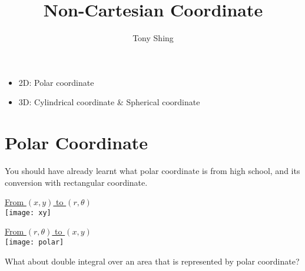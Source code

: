 \documentclass[class=article, crop=false, 12pt]{standalone}
\author{Tony Shing}
\title{Non-Cartesian Coordinate}
\begin{document}
\maketitle


\begin{overview}
    \begin{itemize}
        \item 2D: Polar coordinate
        \item 3D: Cylindrical coordinate \& Spherical coordinate
    \end{itemize}
\end{overview}



\section{Polar Coordinate}

You should have already learnt what polar coordinate is from high school,
and its conversion with rectangular coordinate.

\begin{center}
    \begin{minipage}{0.4\textwidth}
        \centering
        \ul{From $(x,y)$ to $(r,\theta)$}
        \\[1em]
        \texttt{[image: xy]}
        \\[-2em]
    \end{minipage}
    \begin{minipage}{0.4\textwidth}
        \centering
        \ul{From $(r,\theta)$ to $(x,y)$}
        \\[1em]
        \texttt{[image: polar]}
        \\[-2em]
    \end{minipage}
\end{center}


What about double integral over an area that is represented by polar coordinate?

\\
\end{document}
